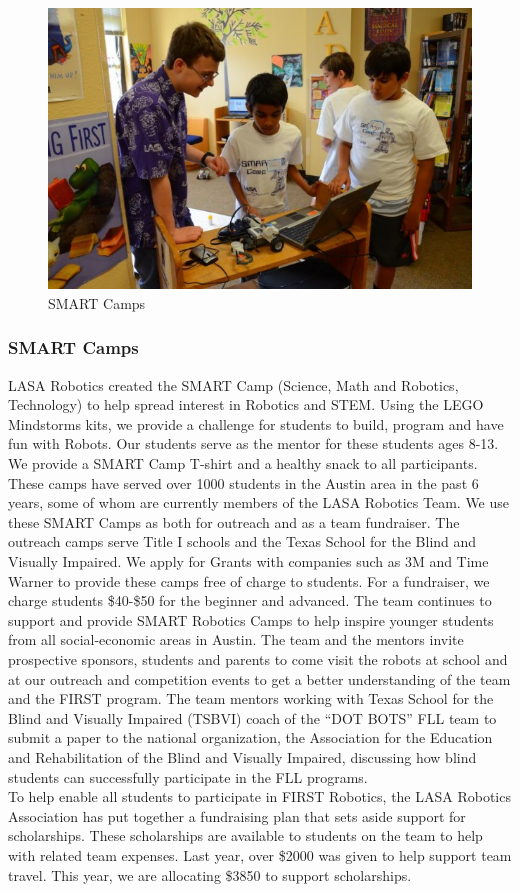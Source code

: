\begin{figure}
	\color{darkgray}
	\centering
	\includegraphics[height=0.3\linewidth]{smart2}
	\caption[]{SMART Camps}
	\label{fig:smart2}
\end{figure}

\subsubsection{SMART Camps}
LASA Robotics created the SMART Camp (Science, Math and Robotics, Technology) to help spread interest in Robotics and STEM. Using the LEGO Mindstorms kits, we provide a challenge for students to build, program and have fun with Robots. Our students serve as the mentor for these students ages 8-13. We provide a SMART Camp T-shirt and a healthy snack to all participants. These camps have served over 1000 students in the Austin area in the past 6 years, some of whom are currently members of the LASA Robotics Team. We use these SMART Camps as both for outreach and as a team fundraiser.   The outreach camps serve Title I schools and the Texas School for the Blind and Visually Impaired. We apply for Grants with companies such as 3M and Time Warner to provide these camps free of charge to students. For a fundraiser, we charge students \$40-\$50 for the beginner and advanced. The team continues to support and provide SMART Robotics Camps to help inspire younger students from all social-economic areas in Austin. The team and the mentors invite prospective sponsors, students and parents to come visit the robots at school and at our outreach and competition events to get a better understanding of the team and the FIRST program. The team mentors working with Texas School for the Blind and Visually Impaired (TSBVI) coach of the “DOT BOTS” FLL team to submit a paper to the national organization, the Association for the Education and Rehabilitation of the Blind and Visually Impaired, discussing how blind students can successfully participate in the FLL programs.\\

To help enable all students to participate in FIRST Robotics, the LASA Robotics Association has put together a fundraising plan that sets aside support for scholarships. These scholarships are available to students on the team to help with related team expenses. Last year, over \$2000 was given to help support team travel. This year, we are allocating \$3850 to support scholarships.


